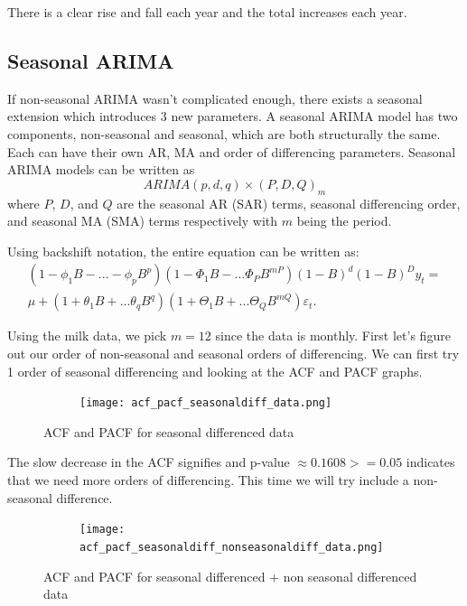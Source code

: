 \documentclass{article}
\begin{document}
  There is a clear rise and fall each year and the total increases each year.

  \subsection{Seasonal ARIMA}
  If non-seasonal ARIMA wasn't complicated enough, there exists a seasonal extension which introduces 3 new parameters. A seasonal ARIMA model has two components, non-seasonal and seasonal, which are both structurally the same. Each can have their own AR, MA and order of differencing parameters. Seasonal ARIMA models can be written as 
  \begin{equation*}
    ARIMA(p,d,q)\times(P,D,Q)_m
  \end{equation*}
  where $P$, $D$, and $Q$ are the seasonal AR (SAR) terms, seasonal differencing order, and seasonal MA (SMA) terms respectively with $m$ being the period.

  Using backshift notation, the entire equation can be written as:
  \begin{equation*}
    \begin{split}
      (1 - \phi_1B - ... - \phi_pB^p)(1 - \Phi_1B - ... \Phi_PB^{mP})(1 - B)^d(1 - B)^D y_t = \\
      \mu + (1 + \theta_1B + ... \theta_qB^q)(1 + \Theta_1B + ... \Theta_QB^{mQ})\varepsilon_t.
    \end{split}
  \end{equation*}

  Using the milk data, we pick $m = 12$ since the data is monthly.
  First let's figure out our order of non-seasonal and seasonal orders of differencing. We can first try 1 order of seasonal differencing and looking at the ACF and PACF graphs.
  \begin{figure}[H]
    \centering
    \captionsetup{justification=centering}
    \begin{subfigure}[b]{\linewidth}
      \texttt{[image: acf\_pacf\_seasonaldiff\_data.png]}
    \end{subfigure}
    \caption{ACF and PACF for seasonal differenced data}
  \end{figure}

  The slow decrease in the ACF signifies and p-value $\approx 0.1608 >=0.05$ indicates that we need more orders of differencing. This time we will try include a non-seasonal difference.
  \begin{figure}[H]
    \centering
    \captionsetup{justification=centering}
    \begin{subfigure}[b]{\linewidth}
      \texttt{[image: acf\_pacf\_seasonaldiff\_nonseasonaldiff\_data.png]}
    \end{subfigure}
    \caption{ACF and PACF for seasonal differenced + non seasonal differenced data}
  \end{figure}
\end{document}
